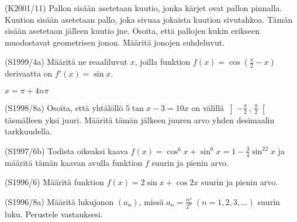 \begin{tehtava} (K2001/11)
	Pallon sisään asetetaan kuutio, jonka kärjet ovat pallon pinnalla. Kuution sisään asetetaan pallo, joka sivuaa 
	jokaista kuution sivutahkoa. Tämän sisään asetetaan jälleen kuutio jne. Osoita, että pallojen 
	kukin erikseen muodostavat geometrisen jonon. Määritä jonojen suhdeluvut.
		\begin{vastaus}
		\end{vastaus}
\end{tehtava}

\begin{tehtava} (S1999/4a)
	Määritä ne reaaliluvut $x$, joilla funktion $f(x)=\cos(\frac{\pi}{2}-x)$ derivaatta on $f'(x)=\sin x$.
		\begin{vastaus}
			$x=\pi+4n\pi$
		\end{vastaus}
\end{tehtava}

\begin{tehtava} (S1998/8a)
	Osoita, että yhtälöllö $5\tan x-3=10x$ on välillä $\left]-\frac{\pi}{2}\,,\,\frac{\pi}{2}\right[$ täsmälleen yksi juuri. 
	Määritä tämän jälkeen juuren arvo yhden desimaalin tarkkuudella.
\end{tehtava}

\begin{tehtava} (S1997/6b)
	Todista oikeaksi kaava $f(x)=\cos^6x+\sin^6x=1-\frac{3}{4}\sin^22x$ ja määritä tämän kaavan avulla funktion $f$ 
	suurin ja pienin arvo.
\end{tehtava}

\begin{tehtava} (S1996/6)
	Määritä funktion $f(x)=2\sin x+\cos2x$ suurin ja pienin arvo.
\end{tehtava}

\begin{tehtava} (S1996/8a)
	Määritä lukujonon $(a_n)$, missä $a_n=\frac{n^4}{2^n} \; (n=1,2,3,\ldots)$ suurin luku. Perustele vastauksesi.
\end{tehtava}

